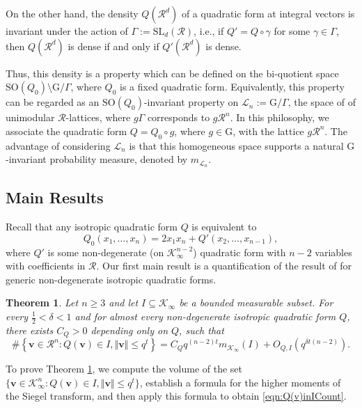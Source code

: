 \documentclass[11pt,a4paper,reqno]{amsart}
\newcommand{\SL}{\mathrm{SL}}
\newcommand{\SO}{{\mathrm{SO}}}
\newtheorem{theorem}{Theorem}[section]
\theoremstyle{definition}
\theoremstyle{remark}
\numberwithin{equation}{section}
\begin{document}
On the other hand, the density $Q(\mathcal R^d)$ of a quadratic form at integral vectors is invariant under the action of $\Gamma:=\SL_d(\mathcal R)$, i.e., if $Q'=Q\circ \gamma$ for some $\gamma\in \Gamma$, then $Q(\mathcal{R}^d)$ is dense if and only if $Q'(\mathcal{R}^d)$ is dense.

Thus, this density is a property which can be defined on the bi-quotient space $\SO(Q_0)\setminus \mathrm{G}/\Gamma$, where $Q_0$ is a fixed quadratic form. Equivalently, this property can be regarded as an $\SO(Q_0)$-invariant property on $\mathcal{L}_n:=\mathrm{G}/\Gamma$, the space of of unimodular $\mathcal R$-lattices, where  $g\Gamma$ corresponds to $g\mathcal R^n$. In this philosophy, we associate the quadratic form $Q=Q_0\circ g$, where $g\in \mathrm{G}$, with the lattice $g\mathcal R^n$.
The advantage of considering $\mathcal L_n$ is that this homogeneous space supports a natural $\mathrm{G}$-invariant probability measure, denoted by $m_{\mathcal{L}_n}$. 
\subsection{Main Results}
Recall that any isotropic quadratic form $Q$ is equivalent to
\[
Q_0(x_1, \ldots, x_n)=2x_1x_n+ Q'(x_2, \ldots, x_{n-1}),
\]
where $Q'$ is some non-degenerate (on $\mathcal{K}_{\infty}^{n-2}$) quadratic form with $n-2$ variables with coefficients in $\mathcal R$.
Our first main result is a quantification of the result of \cite{Moh} for generic non-degenerate isotropic quadratic forms.
\begin{theorem}
\label{thm:N_QCount}
Let $n\ge 3$ and let $I\subseteq \mathcal{K}_{\infty}$ be a bounded measurable subset. For every $\frac{1}{2}<\delta<1$ and for almost every non-degenerate isotropic quadratic form $Q$, there exists $C_Q>0$ depending only on $Q$, such that
\begin{equation}\label{eqn:Q(v)inICount}\#\left\{\mathbf{v}\in \mathcal{R}^n:Q(\mathbf{v})\in I,\Vert \mathbf{v}\Vert\leq q^t\right\}=C_Qq^{(n-2)t}m_{\mathcal{K}_{\infty}}(I)+O_{Q,I}\left(q^{\delta t(n-2)}\right).\end{equation}
\end{theorem}
To prove Theorem \ref{thm:N_QCount}, we compute the volume of the set $\{\mathbf{v}\in \mathcal{K}_{\infty}^n:Q(\mathbf{v})\in I,\Vert \mathbf{v}\Vert\leq q^t\}$, establish a formula for the higher moments of the Siegel transform,  and then apply this formula to obtain \eqref{eqn:Q(v)inICount}.
\end{document}
